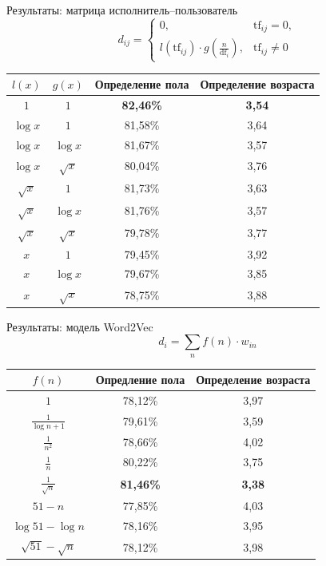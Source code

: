 \documentclass{beamer}
\begin{document}
\begin{frame}{Результаты: матрица исполнитель--пользователь}
    \[d_{ij} = \begin{cases}
              0,& \mathrm{tf}_{ij} = 0,\\
              l(\mathrm{tf}_{ij}) \cdot g(\frac{n}{\mathrm{df}_{i}}),& \mathrm{tf}_{ij} \ne 0
        \end{cases}\]
    \begin{table}[h!]
    \centering
    \begin{tabular}{|c|c|c|c|}
    \hline
    \boldmath$l(x)$ & \boldmath$g(x)$ & \textbf{Определение пола} & \textbf{Определение возраста} \tabularnewline
    \hline
    $1$ & $1$ & \textbf{82,46\%} & \textbf{3,54} \tabularnewline
    \hline
    $\log{x}$ & $1$ & 81,58\% & 3,64 \tabularnewline
    \hline
    $\log{x}$ & $\log{x}$ & 81,67\% & 3,57 \tabularnewline
    \hline
    $\log{x}$ & $\sqrt{x}$ & 80,04\% & 3,76 \tabularnewline
    \hline
    $\sqrt{x}$ & $1$ & 81,73\% & 3,63 \tabularnewline
    \hline
    $\sqrt{x}$ & $\log{x}$ & 81,76\% & 3,57 \tabularnewline
    \hline
    $\sqrt{x}$ & $\sqrt{x}$ & 79,78\% & 3,77 \tabularnewline
    \hline
    $x$ & $1$ & 79,45\% & 3,92 \tabularnewline
    \hline
    $x$ & $\log{x}$ & 79,67\% & 3,85 \tabularnewline
    \hline
    $x$ & $\sqrt{x}$ & 78,75\% & 3,88 \tabularnewline
    \hline
    \end{tabular}
    \label{tab:tfidf_results}
    \end{table}
\end{frame}

\begin{frame}{Результаты: модель Word2Vec}
    \[d_{i} = \sum_{n}{f(n) \cdot w_{in}}\]
    \begin{table}[h!]
    \centering
    \begin{tabular}{|c|c|c|}
    \hline
    \boldmath$f(n)$ & \textbf{Опредление пола} & \textbf{Определение возраста} \tabularnewline
    \hline
    $1$ & 78,12\% & 3,97 \tabularnewline
    \hline
    $\frac{1}{\log{n + 1}}$ & 79,61\% & 3,59 \tabularnewline
    \hline
    $\frac{1}{n^2}$ & 78,66\% & 4,02 \tabularnewline
    \hline
    $\frac{1}{n}$ & 80,22\% & 3,75 \tabularnewline
    \hline
    $\frac{1}{\sqrt{n}}$ & \textbf{81,46\%} & \textbf{3,38} \tabularnewline
    \hline
    $51 - n$ & 77,85\% & 4,03 \tabularnewline
    \hline
    $\log{51} - \log{n}$ & 78,16\% & 3,95 \tabularnewline
    \hline
    $\sqrt{51} - \sqrt{n}$ & 78,12\% & 3,98 \tabularnewline
    \hline
    \end{tabular}
    \label{tab:doc2vec_results}
    \end{table}
\end{frame}
\end{document}

